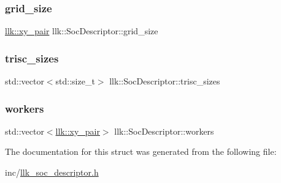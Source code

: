 \subsubsection{\texorpdfstring{grid\+\_\+size}{grid\_size}}
{\footnotesize\ttfamily \hyperlink{structllk_1_1xy__pair}{llk\+::xy\+\_\+pair} llk\+::\+Soc\+Descriptor\+::grid\+\_\+size}

\mbox{\label{structllk_1_1SocDescriptor_adc204a6ea10e5479ff099c9657cb2576}} 
\subsubsection{\texorpdfstring{trisc\+\_\+sizes}{trisc\_sizes}}
{\footnotesize\ttfamily std\+::vector$<$std\+::size\+\_\+t$>$ llk\+::\+Soc\+Descriptor\+::trisc\+\_\+sizes}

\mbox{\label{structllk_1_1SocDescriptor_ae1702fbddb5fd95a4101ac5ee26f7bfb}} 
\subsubsection{\texorpdfstring{workers}{workers}}
{\footnotesize\ttfamily std\+::vector$<$\hyperlink{structllk_1_1xy__pair}{llk\+::xy\+\_\+pair}$>$ llk\+::\+Soc\+Descriptor\+::workers}



The documentation for this struct was generated from the following file\+:\begin{DoxyCompactItemize}
\item 
inc/\hyperlink{llk__soc__descriptor_8h}{llk\+\_\+soc\+\_\+descriptor.\+h}\end{DoxyCompactItemize}

